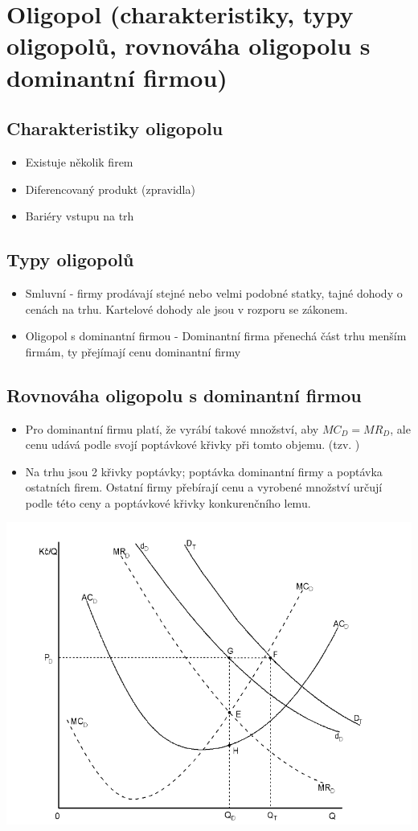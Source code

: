 \clearpage
\section{Oligopol (charakteristiky, typy oligopolů, rovnováha oligopolu s dominantní firmou)}

\subsection{Charakteristiky oligopolu}
\begin{itemize}
    \item Existuje několik firem
    \item Diferencovaný produkt (zpravidla)
    \item Bariéry vstupu na trh
\end{itemize}

\subsection{Typy oligopolů}
\begin{itemize}
    \item Smluvní - firmy prodávají stejné nebo velmi podobné statky, tajné dohody o cenách na trhu. Kartelové dohody ale jsou v rozporu se zákonem.
    \item Oligopol s dominantní firmou - Dominantní firma přenechá část trhu menším firmám, ty přejímají cenu dominantní firmy
\end{itemize}

\subsection{Rovnováha oligopolu s dominantní firmou}
\begin{itemize}
    \item Pro dominantní firmu platí, že vyrábí takové množství, aby $MC_D=MR_D$, ale cenu udává podle svojí poptávkové křivky při tomto objemu. (tzv. )
    \item Na trhu jsou 2 křivky poptávky; poptávka dominantní firmy a poptávka ostatních firem. Ostatní firmy přebírají cenu a vyrobené množství určují podle této ceny a poptávkové křivky konkurenčního lemu.
\end{itemize}
\includegraphics[width=16cm]{images/14_rovnovaha.png}
